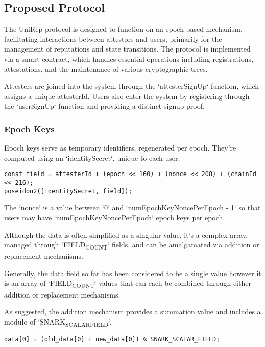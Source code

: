 \documentclass[11pt]{article}
\begin{document}
\subsection{Proposed Protocol}
\label{sec:orgaf0a329}

The UniRep protocol is designed to function on an epoch-based mechanism, facilitating interactions between attestors and users, primarily for the management of reputations and state transitions. The protocol is implemented via a smart contract, which handles essential operations including registrations, attestations, and the maintenance of various cryptographic trees.

Attesters are joined into the system through the `attesterSignUp` function, which assigns a unique attesterId. Users also enter the system by registering through the `userSignUp` function and providing a distinct signup proof.
\subsubsection{Epoch Keys}
\label{sec:orgebd34c9}

Epoch keys serve as temporary identifiers, regenerated per epoch. They're computed using an `identitySecret`, unique to each user.

\begin{verbatim}
const field = attesterId + (epoch << 160) + (nonce << 208) + (chainId << 216);
poseidon2([identitySecret, field]);
\end{verbatim}

The `nonce` is a value between `0` and `numEpochKeyNoncePerEpoch - 1` so that users may have `numEpochKeyNoncePerEpoch` epoch keys per epoch.

Although the data is often simplified as a singular value, it's a complex array, managed through `FIELD\textsubscript{COUNT}` fields, and can be amalgamated via addition or replacement mechanisms.

Generally, the data field so far has been considered to be a single value however it is an array of `FIELD\textsubscript{COUNT}` values that can each be combined through either addition or replacement mechanisms.

As suggested, the addition mechanism provides a summation value and includes a modulo of `SNARK\textsubscript{SCALAR}\textsubscript{FIELD}`.

\begin{verbatim}
data[0] = (old_data[0] + new_data[0]) % SNARK_SCALAR_FIELD;
\end{verbatim}
\end{document}
